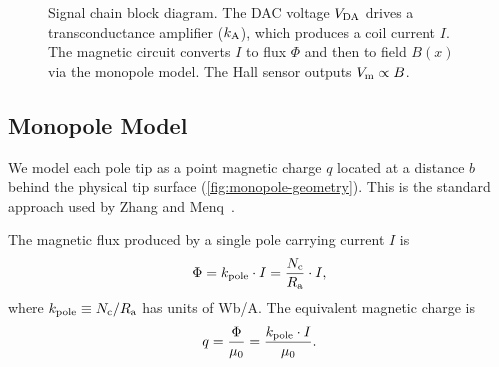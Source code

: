 \begin{figure}[htbp]
\centering
{}
\caption{Signal chain block diagram. The DAC voltage $V_\mathrm{DA}$ drives a
transconductance amplifier ($k_\mathrm{A}$), which produces a coil current $I$.
The magnetic circuit converts $I$ to flux $\Phi$ and then to field $B(x)$
via the monopole model. The Hall sensor outputs $V_\mathrm{m} \propto B$.}
\label{fig:signal-chain}
\end{figure}

\subsection{Monopole Model}
\label{sec:monopole-model}

We model each pole tip as a point magnetic charge $q$ located at a distance
$b$ behind the physical tip surface (\cref{fig:monopole-geometry}). This is
the standard approach used by Zhang and Menq~\cite{Zhang2010,Menq2011}.

The magnetic flux produced by a single pole carrying current $I$ is
\begin{equation}
\Phi = k_\mathrm{pole} \cdot I = \frac{N_\mathrm{c}}{R_\mathrm{a}} \cdot I,
\label{eq:flux}
\end{equation}
where $k_\mathrm{pole} \equiv N_\mathrm{c} / R_\mathrm{a}$ has units of Wb/A. The equivalent magnetic
charge is
\begin{equation}
q = \frac{\Phi}{\mu_0} = \frac{k_\mathrm{pole} \cdot I}{\mu_0}.
\label{eq:charge}
\end{equation}

